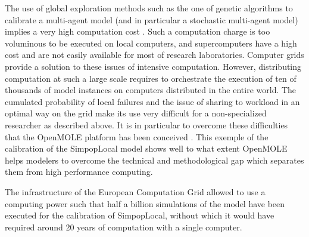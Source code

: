 \documentclass[10pt]{article}
\begin{document}
The use of global exploration methods such as the one of genetic algorithms to calibrate a multi-agent model (and in particular a stochastic multi-agent model) implies a very high computation cost \citep{sharma2006multi}. Such a computation charge is too voluminous to be executed on local computers, and supercomputers have a high cost and are not easily available for most of research laboratories. Computer grids provide a solution to these issues of intensive computation. However, distributing computation at such a large scale requires to orchestrate the execution of ten of thousands of model instances on computers distributed in the entire world. The cumulated probability of local failures and the issue of sharing to workload in an optimal way on the grid make its use very difficult for a non-specialized researcher as described above. It is in particular to overcome these difficulties that the OpenMOLE platform has been conceived \citep{reuillon2010declarative,reuillon2013openmole}. This exemple of the calibration of the SimpopLocal model shows well to what extent OpenMOLE helps modelers to overcome the technical and methodological gap which separates them from high performance computing.


The infrastructure of the European Computation Grid allowed to use a computing power such that half a billion simulations of the model have been executed for the calibration of SimpopLocal, without which it would have required around 20 years of computation with a single computer.
\end{document}
